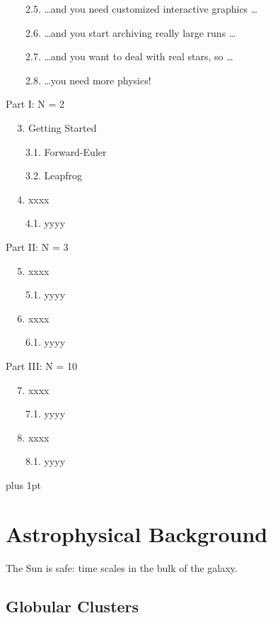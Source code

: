\documentclass{book}
\begin{document}
$\;\;\;\;\;\;$ 2.5. \dots and you need customized interactive graphics \dots

$\;\;\;\;\;\;$ 2.6. \dots and you start archiving really large runs \dots

$\;\;\;\;\;\;$ 2.7. \dots and you want to deal with real stars, so \dots

$\;\;\;\;\;\;$ 2.8. \dots you need more physics!

\medskip

Part I: N = 2

\smallskip

$\;\;\;$ 3. Getting Started

$\;\;\;\;\;\;$ 3.1. Forward-Euler

$\;\;\;\;\;\;$ 3.2. Leapfrog

\smallskip

$\;\;\;$ 4. xxxx

$\;\;\;\;\;\;$ 4.1. yyyy

\medskip

Part II: N = 3

\smallskip

$\;\;\;$ 5. xxxx

$\;\;\;\;\;\;$ 5.1. yyyy

\smallskip

$\;\;\;$ 6. xxxx

$\;\;\;\;\;\;$ 6.1. yyyy

\medskip

Part III: N = 10

\smallskip

$\;\;\;$ 7. xxxx

$\;\;\;\;\;\;$ 7.1. yyyy

\smallskip

$\;\;\;$ 8. xxxx

$\;\;\;\;\;\;$ 8.1. yyyy

\newpage
{}
%
%
\parskip 8pt plus 1pt
%
%

\section{Astrophysical Background}

The Sun is safe: time scales in the bulk of the galaxy.

\subsection{Globular Clusters}
\end{document}

